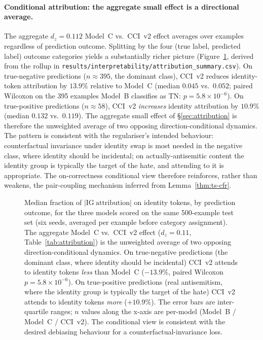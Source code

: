 \documentclass[10pt,a4paper]{article}
\begin{document}
\paragraph{Conditional attribution: the aggregate small effect is a directional average.}
The aggregate $d_z = 0.112$ Model~C vs.\ CCI~v2 effect averages over examples regardless of prediction outcome. Splitting by the four (true label, predicted label) outcome categories yields a substantially richer picture (Figure~\ref{fig:attribution_by_outcome}, derived from the rollup in \texttt{results/interpretability/attribution\_summary.csv}). On true-negative predictions ($n \approx 395$, the dominant class), CCI~v2 reduces identity-token attribution by $13.9\%$ relative to Model~C (median $0.045$ vs.\ $0.052$; paired Wilcoxon on the 395 examples Model~B classifies as TN: $p = 5.8 \times 10^{-6}$). On true-positive predictions ($n \approx 58$), CCI~v2 \emph{increases} identity attribution by $10.9\%$ (median $0.132$ vs.\ $0.119$). The aggregate small effect of \S\ref{sec:attribution} is therefore the unweighted average of two opposing direction-conditional dynamics. The pattern is consistent with the regulariser's intended behaviour: counterfactual invariance under identity swap is most needed in the negative class, where identity should be incidental; on actually-antisemitic content the identity group is typically the target of the hate, and attending to it is appropriate. The on-correctness conditional view therefore reinforces, rather than weakens, the pair-coupling mechanism inferred from Lemma~\ref{thm:ts-cfr}.

\begin{figure}[h]
\centering
\caption{Median fraction of $|\mathrm{IG\ attribution}|$ on identity tokens, by prediction outcome, for the three models scored on the same 500-example test set (six seeds, averaged per example before category assignment). The aggregate Model~C vs.\ CCI~v2 effect ($d_z = 0.11$, Table~\ref{tab:attribution}) is the unweighted average of two opposing direction-conditional dynamics. On true-negative predictions (the dominant class, where identity should be incidental) CCI~v2 attends to identity tokens \emph{less} than Model~C ($-13.9\%$, paired Wilcoxon $p = 5.8 \times 10^{-6}$). On true-positive predictions (real antisemitism, where the identity group is typically the target of the hate) CCI~v2 attends to identity tokens \emph{more} ($+10.9\%$). The error bars are inter-quartile ranges; $n$ values along the x-axis are per-model (Model~B / Model~C / CCI~v2). The conditional view is consistent with the desired debiasing behaviour for a counterfactual-invariance loss.}
\label{fig:attribution_by_outcome}
\end{figure}
\end{document}
